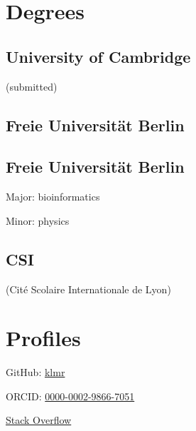 \documentclass{klmr-cv}
\author{Konrad Rudolph}
\begin{document}
\maketitle

\sidebar

\section{Degrees}

\subsection{University of Cambridge}

\date{2011--now}
\item{ (submitted)}

\subsection{Freie Universität Berlin}

\date{2011}
\item{}

\subsection{Freie Universität Berlin}

\date{2008}
\item{}
\item{Major: bioinformatics}
\item{Minor: physics}

\subsection{CSI}

\item{(Cité Scolaire Internationale de Lyon)}
\date{2003}
\item{}

\section{Profiles}

\item{GitHub: \href{http://github.com/klmr}{klmr}}
\item{ORCID: \href{http://orcid.org/0000-0002-9866-7051}{0000-0002-9866-7051}}
\item{\href{http://stackoverflow.com/users/1968/konrad-rudolph}{Stack Overflow}}
\end{document}
